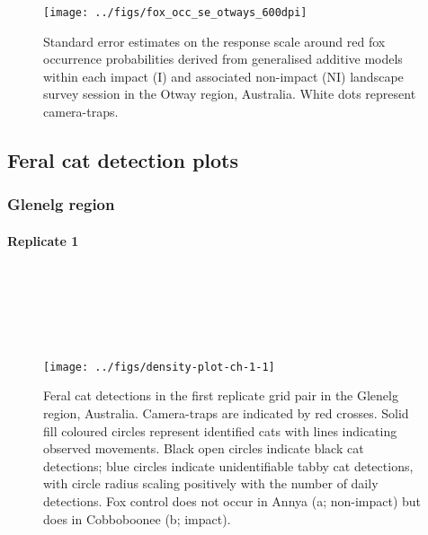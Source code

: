 \documentclass[preprint, 3p, authoryear]{elsarticle} %
\begin{document}
\begin{figure}

{\centering \texttt{[image: ../figs/fox\_occ\_se\_otways\_600dpi]} 

}

\caption{Standard error estimates on the response scale around red fox occurrence probabilities derived from generalised additive models within each impact (I) and associated non-impact (NI) landscape survey session in the Otway region, Australia. White dots represent camera-traps.}\label{fig:density-fox-se-o}
\end{figure}

\newpage

\hypertarget{feral-cat-detection-plots}{%
\subsection{Feral cat detection plots}\label{feral-cat-detection-plots}}

\hypertarget{glenelg-region-2}{%
\subsubsection{Glenelg region}\label{glenelg-region-2}}

\hypertarget{replicate-1}{%
\paragraph*{Replicate 1}\label{replicate-1}}

\(~\)

\(~\)

\(~\)

\begin{figure}

{\centering \texttt{[image: ../figs/density-plot-ch-1-1]} 

}

\caption{Feral cat detections in the first replicate grid pair in the Glenelg region, Australia. Camera-traps are indicated by red crosses. Solid fill coloured circles represent identified cats with lines indicating observed movements. Black open circles indicate black cat detections; blue circles indicate unidentifiable tabby cat detections, with circle radius scaling positively with the number of daily detections. Fox control does not occur in Annya (a; non-impact) but does in Cobboboonee (b; impact).}\label{fig:density-plot-ch-1}
\end{figure}
\end{document}
